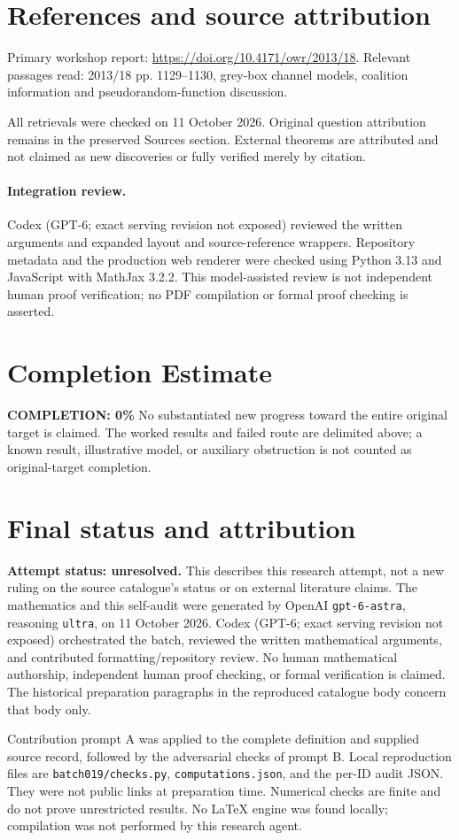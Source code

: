 \documentclass[11pt]{article}
\begin{document}
\section{References and source attribution}
Primary workshop report: \url{https://doi.org/10.4171/owr/2013/18}. Relevant passages read: 2013/18 pp. 1129--1130, grey-box channel models, coalition information and pseudorandom-function discussion.

All retrievals were checked on 11 October 2026. Original question attribution remains in the preserved Sources section. External theorems are attributed and not claimed as new discoveries or fully verified merely by citation.


\paragraph{Integration review.} Codex (GPT-6; exact serving revision not exposed) reviewed the written arguments and expanded layout and source-reference wrappers. Repository metadata and the production web renderer were checked using Python 3.13 and JavaScript with MathJax 3.2.2. This model-assisted review is not independent human proof verification; no PDF compilation or formal proof checking is asserted.

\section{Completion Estimate}
\noindent\textbf{COMPLETION: 0\%}
No substantiated new progress toward the entire original target is claimed. The worked results and failed route are delimited above; a known result, illustrative model, or auxiliary obstruction is not counted as original-target completion.

\section{Final status and attribution}
\textbf{Attempt status: unresolved.} This describes this research attempt, not a new ruling on the source catalogue's status or on external literature claims.
The mathematics and this self-audit were generated by OpenAI \texttt{gpt-6-astra}, reasoning \texttt{ultra}, on 11 October 2026. Codex (GPT-6; exact serving revision not exposed) orchestrated the batch, reviewed the written mathematical arguments, and contributed formatting/repository review. No human mathematical authorship, independent human proof checking, or formal verification is claimed. The historical preparation paragraphs in the reproduced catalogue body concern that body only.

Contribution prompt A was applied to the complete definition and supplied source record, followed by the adversarial checks of prompt B. Local reproduction files are \texttt{batch019/checks.py}, \texttt{computations.json}, and the per-ID audit JSON. They were not public links at preparation time. Numerical checks are finite and do not prove unrestricted results. No LaTeX engine was found locally; compilation was not performed by this research agent.
\end{document}
